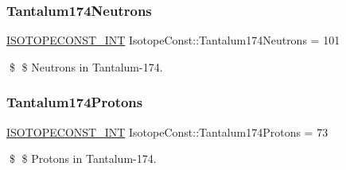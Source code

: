 \subsubsection{\texorpdfstring{Tantalum174\+Neutrons}{Tantalum174Neutrons}}
{\footnotesize\ttfamily \mbox{\hyperlink{group___isotope_const-_macros_ga5f18360b3e99483a35c32d789e62621c}{I\+S\+O\+T\+O\+P\+E\+C\+O\+N\+S\+T\+\_\+\+I\+NT}} Isotope\+Const\+::\+Tantalum174\+Neutrons = 101}

\$ \$ Neutrons in Tantalum-\/174. \mbox{\label{group___isotope_const-_tantalum-_ta174_ga851a38424bb7b0bd301ebf1d60d036eb}} 
\subsubsection{\texorpdfstring{Tantalum174\+Protons}{Tantalum174Protons}}
{\footnotesize\ttfamily \mbox{\hyperlink{group___isotope_const-_macros_ga5f18360b3e99483a35c32d789e62621c}{I\+S\+O\+T\+O\+P\+E\+C\+O\+N\+S\+T\+\_\+\+I\+NT}} Isotope\+Const\+::\+Tantalum174\+Protons = 73}

\$ \$ Protons in Tantalum-\/174. 